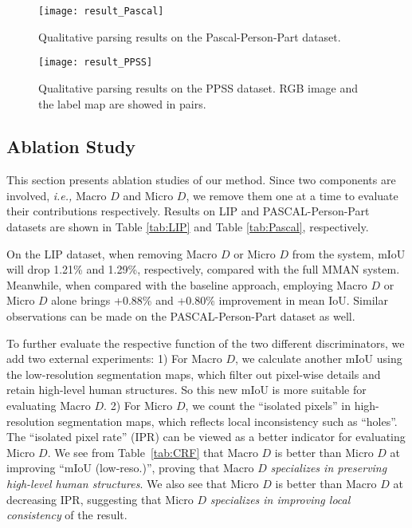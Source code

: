 \documentclass[runningheads]{llncs}
\begin{document}
\begin{figure}[t]
\centering
\texttt{[image: result\_Pascal]}
\caption{Qualitative parsing results on the Pascal-Person-Part dataset.}
\label{fig:result_Pascal}
\vspace{-0.2cm}
\end{figure}

\begin{figure}[!htb]
\centering
\texttt{[image: result\_PPSS]}
\caption{Qualitative parsing results on the PPSS dataset. RGB image and the label map are showed in pairs.}
\label{fig:result_PPSS}
\vspace{-0.2cm}
\end{figure}

\subsection{Ablation Study}\label{Ablation}
This section presents ablation studies of our method. Since two components are involved, \emph{i.e.,} Macro $D$ and Micro $D$, we remove them one at a time to evaluate their  contributions respectively. Results on LIP and PASCAL-Person-Part datasets are shown in Table \ref{tab:LIP} and Table \ref{tab:Pascal}, respectively.

On the LIP dataset, when removing Macro $D$ or Micro $D$ from the system, mIoU will drop 1.21\% and 1.29\%, respectively, compared with the full MMAN system. Meanwhile, when compared with the baseline approach, employing Macro $D$ or Micro $D$ alone brings +0.88\% and +0.80\% improvement in mean IoU. Similar observations can be made on the PASCAL-Person-Part dataset as well. 

To further evaluate the respective function of the two different discriminators, we add two external experiments: 1) For Macro $D$, we calculate another mIoU using the low-resolution segmentation maps, which filter out pixel-wise details and retain high-level human structures. So this new mIoU is more suitable for evaluating Macro $D$. 2) For Micro $D$, we count the ``isolated pixels'' in high-resolution segmentation maps, which reflects local inconsistency such as ``holes''. The ``isolated pixel rate'' (IPR) can be viewed as a better indicator for evaluating Micro $D$. We see from Table~\ref{tab:CRF} that Macro $D$ is better than Micro $D$ at improving ``mIoU (low-reso.)'', proving that Macro $D$ \emph{specializes in preserving high-level human structures}. We also see that Micro $D$ is better than Macro $D$ at decreasing IPR, suggesting that Micro $D$ \emph{specializes in improving local consistency} of the result.
\end{document}
